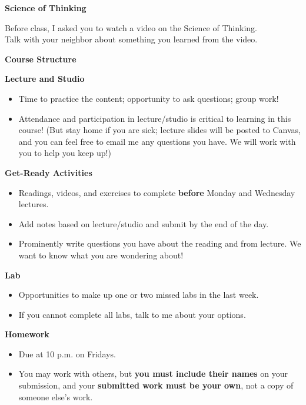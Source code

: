 \documentclass[]{article}
\begin{document}
\begin{PresentSpace}
\begin{center}
	\textbf{Science of Thinking}
\end{center}
Before class, I asked you to watch a video on the Science of Thinking. \\

\noindent Talk with your neighbor about something you learned from the video.
\vspace{0.5cm}
\begin{center}
	\textbf{Course Structure}
\end{center}
\noindent\textbf{Lecture and Studio}
\begin{itemize}
\item Time to practice the content; opportunity to ask questions; group work!
\item Attendance and participation in lecture/studio is critical to learning in this course! (But stay home if you are sick; lecture slides will be posted to Canvas, and you can feel free to email me any questions you have. We will work with you to help you keep up!)
\end{itemize}
\noindent\textbf{Get-Ready Activities}
\begin{itemize}
	\item Readings, videos, and exercises to complete \textbf{before} Monday and Wednesday lectures.
	\item Add notes based on lecture/studio and submit by the end of the day.
	\item Prominently write questions you have about the reading and from lecture. We want to know what you are wondering about!
\end{itemize}
\noindent\textbf{Lab}
\begin{itemize}
	\item Opportunities to make up one or two missed labs in the last week.
	\item If you cannot complete all labs, talk to me about your options.
\end{itemize}
\noindent\textbf{Homework}
\begin{itemize}
	\item Due at 10 p.m. on Fridays.
	\item You may work with others, but \textbf{you must include their names} on your submission, and your \textbf{submitted work must be your own}, not a copy of someone else's work.
\end{itemize}
\end{PresentSpace}
\end{document}
